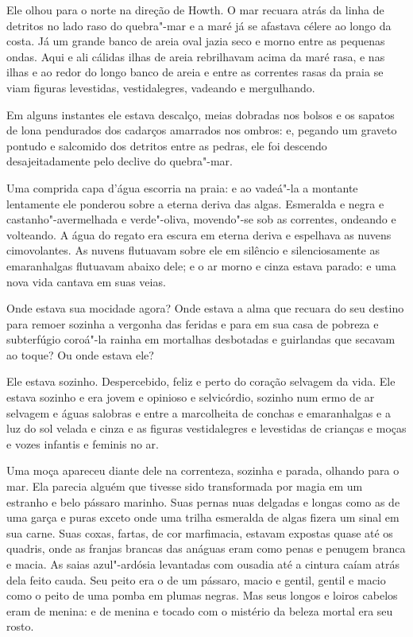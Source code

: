 Ele olhou para o norte na direção de Howth. O mar recuara atrás da linha
de detritos no lado raso do quebra"-mar e a maré já se afastava célere
ao longo da costa. Já um grande banco de areia oval jazia seco e morno
entre as pequenas ondas. Aqui e ali cálidas ilhas de areia rebrilhavam
acima da maré rasa, e nas ilhas e ao redor do longo banco de areia e
entre as correntes rasas da praia se viam figuras levestidas,
vestidalegres, vadeando e mergulhando.                                  

Em alguns instantes ele estava descalço, meias dobradas nos bolsos e os
sapatos de lona pendurados dos cadarços amarrados nos ombros: e,
pegando um graveto pontudo e salcomido dos detritos entre as pedras, 
ele foi descendo desajeitadamente pelo declive do quebra"-mar.

Uma comprida capa d’água escorria na praia: e ao vadeá"-la a montante
lentamente ele ponderou sobre a eterna deriva das algas. Esmeralda e
negra e castanho"-avermelhada e verde"-oliva, movendo"-se sob as
correntes, ondeando e volteando. A água do regato era escura em eterna
deriva e espelhava as nuvens cimovolantes. As nuvens flutuavam sobre 
ele em silêncio e silenciosamente as emaranhalgas flutuavam abaixo 
dele; e o ar morno e cinza estava parado: e uma nova vida cantava em
suas veias.

Onde estava sua mocidade agora? Onde estava a alma que recuara do seu
destino para remoer sozinha a vergonha das feridas e para em sua casa
de pobreza e subterfúgio coroá"-la rainha em mortalhas desbotadas e
guirlandas que secavam ao toque? Ou onde estava ele?

Ele estava sozinho. Despercebido, feliz e perto do coração selvagem da
vida. Ele estava sozinho e era jovem e opinioso e selvicórdio,		
sozinho num ermo de ar selvagem e águas salobras e entre a marcolheita  
de conchas e emaranhalgas e a luz do sol velada e cinza e as figuras    
vestidalegres e levestidas de crianças e moças e vozes infantis e
feminis no ar.

Uma moça apareceu diante dele na correnteza, sozinha e parada, olhando
para o mar. Ela parecia alguém que tivesse sido transformada por magia
em um estranho e belo pássaro marinho. Suas pernas nuas delgadas e
longas como as de uma garça e puras exceto onde uma trilha esmeralda de
algas fizera um sinal em sua carne. Suas coxas, fartas, de cor
marfimacia, estavam expostas quase até os quadris, onde as franjas  
brancas das anáguas eram como penas e penugem branca e macia. As saias
azul"-ardósia levantadas com ousadia até a cintura caíam atrás dela
feito cauda. Seu peito era o de um pássaro, macio e gentil, gentil e
macio como o peito de uma pomba em plumas negras. Mas seus longos e
loiros cabelos eram de menina: e de menina e tocado com o mistério da
beleza mortal era seu rosto.

